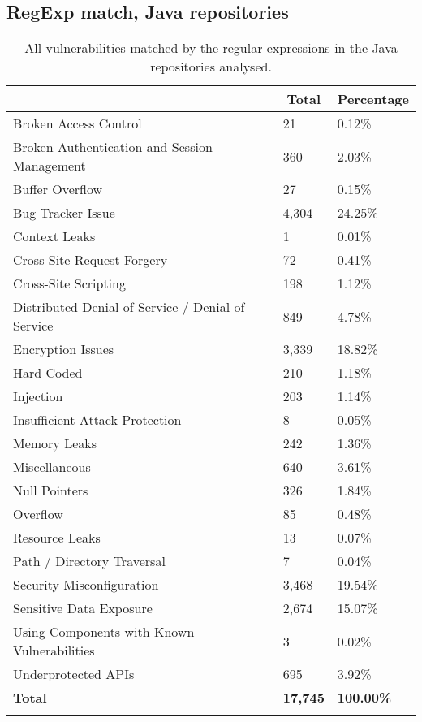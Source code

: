 \documentclass[acb16zje.tex]{subfiles}
\begin{document}
\subsection{RegExp match, Java repositories}
\begin{longtable}{|l|l|l|}
  \hline \endfirsthead \rowcolor[HTML]{D8D8D8}
  \multicolumn{1}{|c|}{Vulnerabilities} & \multicolumn{1}{|c|}{Total} &
  \multicolumn{1}{|c|}{Percentage} \\ \hline
  Broken Access Control & 21 & 0.12\% \\
  Broken Authentication and Session Management & 360 & 2.03\% \\
  Buffer Overflow & 27 & 0.15\% \\
  Bug Tracker Issue & 4,304 & 24.25\% \\
  Context Leaks & 1 & 0.01\% \\
  Cross-Site Request Forgery & 72 & 0.41\% \\
  Cross-Site Scripting & 198 & 1.12\% \\
  Distributed Denial-of-Service / Denial-of-Service & 849 & 4.78\% \\
  Encryption Issues & 3,339 & 18.82\% \\
  Hard Coded & 210 & 1.18\% \\
  Injection & 203 & 1.14\% \\
  Insufficient Attack Protection & 8 & 0.05\% \\
  Memory Leaks & 242 & 1.36\% \\
  Miscellaneous & 640 & 3.61\% \\
  Null Pointers & 326 & 1.84\% \\
  Overflow & 85 & 0.48\% \\
  Resource Leaks & 13 & 0.07\% \\
  Path / Directory Traversal & 7 & 0.04\% \\
  Security Misconfiguration & 3,468 & 19.54\% \\
  Sensitive Data Exposure & 2,674 & 15.07\% \\
  Using Components with Known Vulnerabilities & 3 & 0.02\% \\
  Underprotected APIs & 695 & 3.92\% \\ \hline
  \textbf{Total} & \textbf{17,745} & \textbf{100.00\%} \\ \hline
  \caption{All vulnerabilities matched by the regular expressions in the Java repositories
  analysed.}
\end{longtable}
\end{document}

